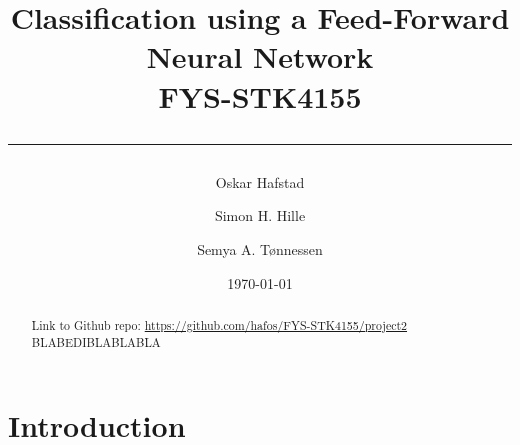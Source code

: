 \documentclass[english,notitlepage,reprint,nofootinbib]{revtex4–2}  %
\begin{document}

\title{\vspace*{-2cm}\bf Classification using a Feed-Forward Neural Network \hspace*{5cm}\\
FYS-STK4155\\
\rule{\textwidth}{0.05cm}}
\author[1]{Oskar Hafstad}
\author[3]{Simon H. Hille}
\author[1, 2]{Semya A. Tønnessen}
\date{\today}
\begin{abstract} \centering Link to Github repo: \url{https://github.com/hafos/FYS-STK4155/project2}%
\vspace{3mm}
\\
BLABEDIBLABLABLA
\end{abstract}
\maketitle

\section{Introduction} 
\end{document}
